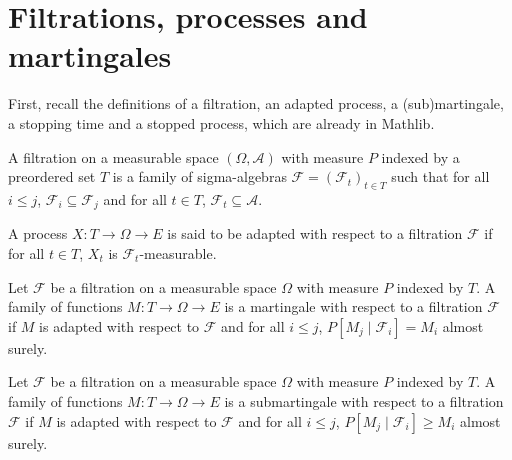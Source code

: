 \chapter{{Filtrations, processes and martingales}}\label{chap:filtration_martingale}


First, recall the definitions of a filtration, an adapted process, a (sub)martingale, a stopping time and a stopped process, which are already in Mathlib.


\begin{definition}[Filtration]\label{def:filtration}
  \mathlibok
A filtration on a measurable space $(\Omega, \mathcal{A})$ with measure $P$ indexed by a preordered set $T$ is a family of sigma-algebras $\mathcal{F} = (\mathcal{F}_t)_{t \in T}$ such that for all $i \le j$, $\mathcal{F}_i \subseteq \mathcal{F}_j$ and for all $t \in T$, $\mathcal{F}_t \subseteq \mathcal{A}$.
\end{definition}


\begin{definition}\label{def:adapted}
  \mathlibok
A process $X : T \to \Omega \to E$ is said to be adapted with respect to a filtration $\mathcal{F}$ if for all $t \in T$, $X_t$ is $\mathcal{F}_t$-measurable.
\end{definition}


\begin{definition}[Martingale]\label{def:Martingale}
  \mathlibok
Let $\mathcal{F}$ be a filtration on a measurable space $\Omega$ with measure $P$ indexed by $T$.
A family of functions $M : T \to \Omega \to E$ is a martingale with respect to a filtration $\mathcal{F}$ if $M$ is adapted with respect to $\mathcal{F}$ and for all $i \le j$, $P[M_j \mid \mathcal{F}_i] = M_i$ almost surely.
\end{definition}


\begin{definition}[Submartingale]\label{def:Submartingale}
  \mathlibok
Let $\mathcal{F}$ be a filtration on a measurable space $\Omega$ with measure $P$ indexed by $T$.
A family of functions $M : T \to \Omega \to E$ is a submartingale with respect to a filtration $\mathcal{F}$ if $M$ is adapted with respect to $\mathcal{F}$ and for all $i \le j$, $P[M_j \mid \mathcal{F}_i] \ge M_i$ almost surely.
\end{definition}


